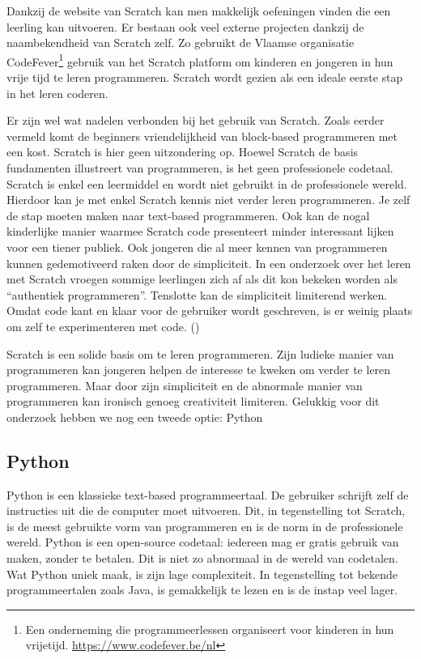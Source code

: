 Dankzij de website van Scratch kan men makkelijk oefeningen vinden die een leerling kan uitvoeren. Er bestaan ook veel externe projecten dankzij de naambekendheid van Scratch zelf. Zo gebruikt de Vlaamse organisatie CodeFever\footnote{Een onderneming die programmeerlessen organiseert voor kinderen in hun vrijetijd. \url{https://www.codefever.be/nl}} gebruik van het Scratch platform om kinderen en jongeren in hun vrije tijd te leren programmeren. Scratch wordt gezien als een ideale eerste stap in het leren coderen.

Er zijn wel wat nadelen verbonden bij het gebruik van Scratch. Zoals eerder vermeld komt de beginners vriendelijkheid van block-based programmeren met een kost. Scratch is hier geen uitzondering op. Hoewel Scratch de basis fundamenten illustreert van programmeren, is het geen professionele codetaal. Scratch is enkel een leermiddel en wordt niet gebruikt in de professionele wereld. Hierdoor kan je met enkel Scratch kennis niet verder leren programmeren. Je zelf de stap moeten maken naar text-based programmeren.
Ook kan de nogal kinderlijke manier waarmee Scratch code presenteert minder interessant lijken voor een tiener publiek. Ook jongeren die al meer kennen van programmeren kunnen gedemotiveerd raken door de simpliciteit. In een onderzoek over het leren met Scratch vroegen sommige leerlingen zich af als dit kon bekeken worden als “authentiek programmeren”. 
Tenslotte kan de simpliciteit limiterend werken. Omdat code kant en klaar voor de gebruiker wordt geschreven, is er weinig plaats om zelf te experimenteren met code. (\cite{Armoni2015,Fagan2017})

Scratch is een solide basis om te leren programmeren. Zijn ludieke manier van programmeren kan jongeren helpen de interesse te kweken om verder te leren programmeren. Maar door zijn simpliciteit en de abnormale manier van programmeren kan ironisch genoeg creativiteit limiteren. Gelukkig voor dit onderzoek hebben we nog een tweede optie: Python

\subsection{Python}

Python is een klassieke text-based programmeertaal. De gebruiker schrijft zelf de instructies uit die de computer moet uitvoeren. Dit, in tegenstelling tot Scratch, is de meest gebruikte vorm van programmeren en is de norm in de professionele wereld. Python is een open-source codetaal: iedereen mag er gratis gebruik van maken, zonder te betalen. Dit is niet zo abnormaal in de wereld van codetalen. Wat Python uniek maak, is zijn lage complexiteit. In tegenstelling tot bekende programmeertalen zoals Java, is gemakkelijk te lezen en is de instap veel lager. 

